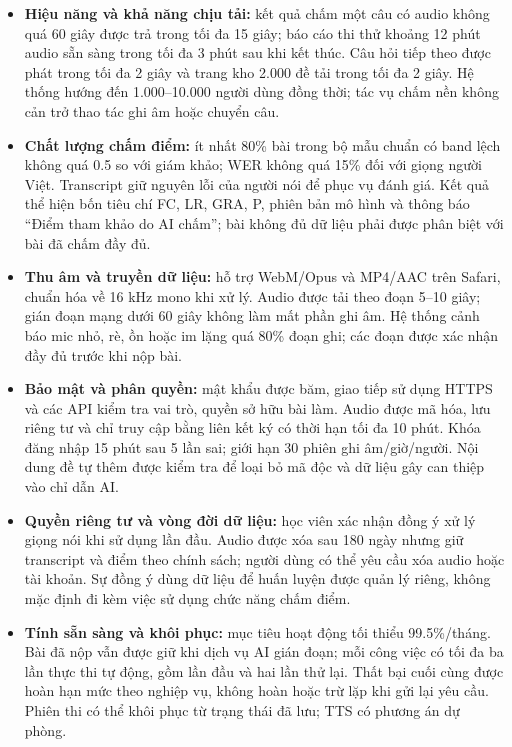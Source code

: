 \begin{itemize}
\item \textbf{Hiệu năng và khả năng chịu tải:} kết quả chấm một câu có audio không quá 60 giây được trả trong tối đa 15 giây; báo cáo thi thử khoảng 12 phút audio sẵn sàng trong tối đa 3 phút sau khi kết thúc. Câu hỏi tiếp theo được phát trong tối đa 2 giây và trang kho 2.000 đề tải trong tối đa 2 giây. Hệ thống hướng đến 1.000--10.000 người dùng đồng thời; tác vụ chấm nền không cản trở thao tác ghi âm hoặc chuyển câu.

\item \textbf{Chất lượng chấm điểm:} ít nhất 80\% bài trong bộ mẫu chuẩn có band lệch không quá 0.5 so với giám khảo; WER không quá 15\% đối với giọng người Việt. Transcript giữ nguyên lỗi của người nói để phục vụ đánh giá. Kết quả thể hiện bốn tiêu chí FC, LR, GRA, P, phiên bản mô hình và thông báo ``Điểm tham khảo do AI chấm''; bài không đủ dữ liệu phải được phân biệt với bài đã chấm đầy đủ.

\item \textbf{Thu âm và truyền dữ liệu:} hỗ trợ WebM/Opus và MP4/AAC trên Safari, chuẩn hóa về 16 kHz mono khi xử lý. Audio được tải theo đoạn 5--10 giây; gián đoạn mạng dưới 60 giây không làm mất phần ghi âm. Hệ thống cảnh báo mic nhỏ, rè, ồn hoặc im lặng quá 80\% đoạn ghi; các đoạn được xác nhận đầy đủ trước khi nộp bài.

\item \textbf{Bảo mật và phân quyền:} mật khẩu được băm, giao tiếp sử dụng HTTPS và các API kiểm tra vai trò, quyền sở hữu bài làm. Audio được mã hóa, lưu riêng tư và chỉ truy cập bằng liên kết ký có thời hạn tối đa 10 phút. Khóa đăng nhập 15 phút sau 5 lần sai; giới hạn 30 phiên ghi âm/giờ/người. Nội dung đề tự thêm được kiểm tra để loại bỏ mã độc và dữ liệu gây can thiệp vào chỉ dẫn AI.

\item \textbf{Quyền riêng tư và vòng đời dữ liệu:} học viên xác nhận đồng ý xử lý giọng nói khi sử dụng lần đầu. Audio được xóa sau 180 ngày nhưng giữ transcript và điểm theo chính sách; người dùng có thể yêu cầu xóa audio hoặc tài khoản. Sự đồng ý dùng dữ liệu để huấn luyện được quản lý riêng, không mặc định đi kèm việc sử dụng chức năng chấm điểm.

\item \textbf{Tính sẵn sàng và khôi phục:} mục tiêu hoạt động tối thiểu 99.5\%/tháng. Bài đã nộp vẫn được giữ khi dịch vụ AI gián đoạn; mỗi công việc có tối đa ba lần thực thi tự động, gồm lần đầu và hai lần thử lại. Thất bại cuối cùng được hoàn hạn mức theo nghiệp vụ, không hoàn hoặc trừ lặp khi gửi lại yêu cầu. Phiên thi có thể khôi phục từ trạng thái đã lưu; TTS có phương án dự phòng.


\end{itemize}
